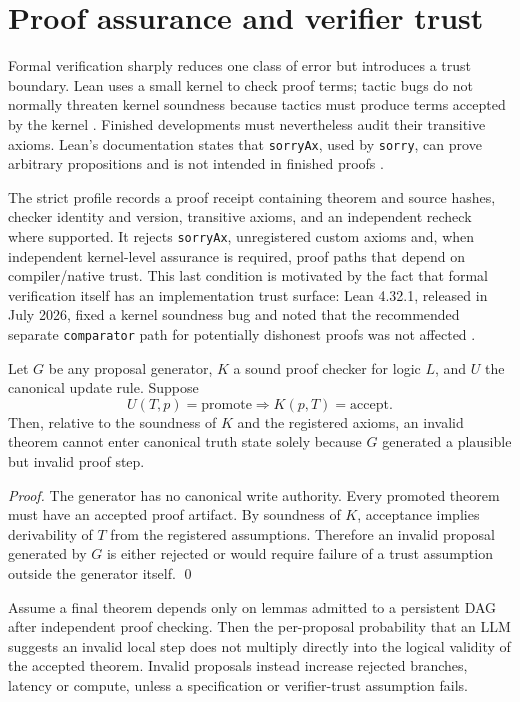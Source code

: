 \section{Proof assurance and verifier trust}

Formal verification sharply reduces one class of error but introduces a trust boundary. Lean uses a small kernel to check proof terms; tactic bugs do not normally threaten kernel soundness because tactics must produce terms accepted by the kernel \cite{leanref}. Finished developments must nevertheless audit their transitive axioms. Lean's documentation states that \texttt{sorryAx}, used by \texttt{sorry}, can prove arbitrary propositions and is not intended in finished proofs \cite{leanaxioms}.

The strict profile records a proof receipt containing theorem and source hashes, checker identity and version, transitive axioms, and an independent recheck where supported. It rejects \texttt{sorryAx}, unregistered custom axioms and, when independent kernel-level assurance is required, proof paths that depend on compiler/native trust. This last condition is motivated by the fact that formal verification itself has an implementation trust surface: Lean 4.32.1, released in July 2026, fixed a kernel soundness bug and noted that the recommended separate \texttt{comparator} path for potentially dishonest proofs was not affected \cite{lean4321}.

\begin{proposition}
Let $G$ be any proposal generator, $K$ a sound proof checker for logic $L$, and $U$ the canonical update rule. Suppose
\[
U(T,p)=\mathrm{promote}\Longrightarrow K(p,T)=\mathrm{accept}.
\]
Then, relative to the soundness of $K$ and the registered axioms, an invalid theorem cannot enter canonical truth state solely because $G$ generated a plausible but invalid proof step.
\end{proposition}

\begin{proof}
The generator has no canonical write authority. Every promoted theorem must have an accepted proof artifact. By soundness of $K$, acceptance implies derivability of $T$ from the registered assumptions. Therefore an invalid proposal generated by $G$ is either rejected or would require failure of a trust assumption outside the generator itself. \qed
\end{proof}

\begin{proposition}
Assume a final theorem depends only on lemmas admitted to a persistent DAG after independent proof checking. Then the per-proposal probability that an LLM suggests an invalid local step does not multiply directly into the logical validity of the accepted theorem. Invalid proposals instead increase rejected branches, latency or compute, unless a specification or verifier-trust assumption fails.
\end{proposition}

